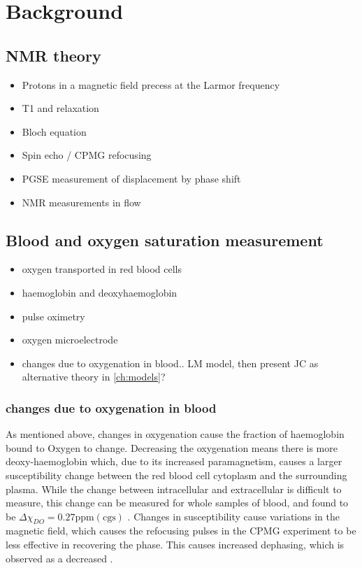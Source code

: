 \chapter{Background}\label{ch:background}

\section{NMR theory}
\begin{itemize}
\item Protons in a magnetic field precess at the Larmor frequency
\item T1 and \Ttwo relaxation
\item Bloch equation
\item Spin echo / CPMG refocusing
\item PGSE measurement of displacement by phase shift
\item NMR measurements in flow
\end{itemize}

\section{Blood and oxygen saturation measurement}
\begin{itemize}
\item oxygen transported in red blood cells
\item haemoglobin and deoxyhaemoglobin
\item pulse oximetry
\item oxygen microelectrode
\item \Ttwo changes due to oxygenation in blood.. LM model, then present JC as alternative theory in \autoref{ch:models}?

\end{itemize}

\subsection{\Ttwo changes due to oxygenation in blood}
\label{sec:back-TtwoSOtwo}
As mentioned above, changes in oxygenation cause the fraction of haemoglobin bound to Oxygen to change.
Decreasing the oxygenation means there is more deoxy-haemoglobin which, due to its increased paramagnetism, causes a larger susceptibility change between the red blood cell cytoplasm and the surrounding plasma.
While the change between intracellular and extracellular is difficult to measure, this change can be measured for whole samples of blood, and found to be $\Delta\chi_{DO} = 0.27 \mathrm{ppm  (cgs)}$ \cite{JainInvestigatingmagneticsusceptibility2012}.
Changes in susceptibility cause variations in the magnetic field, which causes the refocusing pulses in the CPMG experiment to be less effective in recovering the phase.
This causes increased dephasing, which is observed as a decreased \Ttwo.

